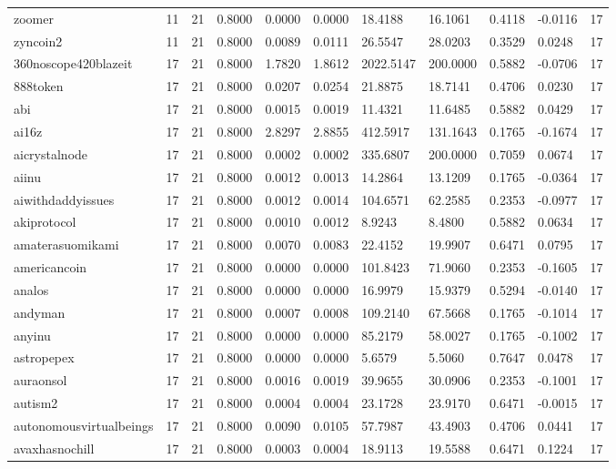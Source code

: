 \begin{table}[htbp]
\begin{tabular}{lllllllllll}
zoomer & 11 & 21 & 0.8000 & 0.0000 & 0.0000 & 18.4188 & 16.1061 & 0.4118 & -0.0116 & 17 \\
zyncoin2 & 11 & 21 & 0.8000 & 0.0089 & 0.0111 & 26.5547 & 28.0203 & 0.3529 & 0.0248 & 17 \\
360noscope420blazeit & 17 & 21 & 0.8000 & 1.7820 & 1.8612 & 2022.5147 & 200.0000 & 0.5882 & -0.0706 & 17 \\
888token & 17 & 21 & 0.8000 & 0.0207 & 0.0254 & 21.8875 & 18.7141 & 0.4706 & 0.0230 & 17 \\
abi & 17 & 21 & 0.8000 & 0.0015 & 0.0019 & 11.4321 & 11.6485 & 0.5882 & 0.0429 & 17 \\
ai16z & 17 & 21 & 0.8000 & 2.8297 & 2.8855 & 412.5917 & 131.1643 & 0.1765 & -0.1674 & 17 \\
aicrystalnode & 17 & 21 & 0.8000 & 0.0002 & 0.0002 & 335.6807 & 200.0000 & 0.7059 & 0.0674 & 17 \\
aiinu & 17 & 21 & 0.8000 & 0.0012 & 0.0013 & 14.2864 & 13.1209 & 0.1765 & -0.0364 & 17 \\
aiwithdaddyissues & 17 & 21 & 0.8000 & 0.0012 & 0.0014 & 104.6571 & 62.2585 & 0.2353 & -0.0977 & 17 \\
akiprotocol & 17 & 21 & 0.8000 & 0.0010 & 0.0012 & 8.9243 & 8.4800 & 0.5882 & 0.0634 & 17 \\
amaterasuomikami & 17 & 21 & 0.8000 & 0.0070 & 0.0083 & 22.4152 & 19.9907 & 0.6471 & 0.0795 & 17 \\
americancoin & 17 & 21 & 0.8000 & 0.0000 & 0.0000 & 101.8423 & 71.9060 & 0.2353 & -0.1605 & 17 \\
analos & 17 & 21 & 0.8000 & 0.0000 & 0.0000 & 16.9979 & 15.9379 & 0.5294 & -0.0140 & 17 \\
andyman & 17 & 21 & 0.8000 & 0.0007 & 0.0008 & 109.2140 & 67.5668 & 0.1765 & -0.1014 & 17 \\
anyinu & 17 & 21 & 0.8000 & 0.0000 & 0.0000 & 85.2179 & 58.0027 & 0.1765 & -0.1002 & 17 \\
astropepex & 17 & 21 & 0.8000 & 0.0000 & 0.0000 & 5.6579 & 5.5060 & 0.7647 & 0.0478 & 17 \\
auraonsol & 17 & 21 & 0.8000 & 0.0016 & 0.0019 & 39.9655 & 30.0906 & 0.2353 & -0.1001 & 17 \\
autism2 & 17 & 21 & 0.8000 & 0.0004 & 0.0004 & 23.1728 & 23.9170 & 0.6471 & -0.0015 & 17 \\
autonomousvirtualbeings & 17 & 21 & 0.8000 & 0.0090 & 0.0105 & 57.7987 & 43.4903 & 0.4706 & 0.0441 & 17 \\
avaxhasnochill & 17 & 21 & 0.8000 & 0.0003 & 0.0004 & 18.9113 & 19.5588 & 0.6471 & 0.1224 & 17 \\

\end{tabular}
\end{table}
